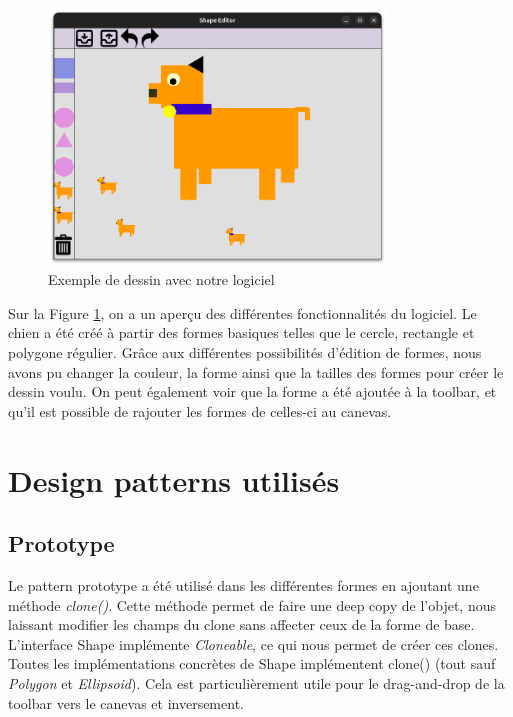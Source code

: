 \documentclass{article}
\begin{document}
\begin{figure}[h]
    \centering
    \includegraphics[width=0.8\textwidth,keepaspectratio]{dog.png}
    \caption{Exemple de dessin avec notre logiciel}
    \label{Clebs}
\end{figure}
\FloatBarrier
Sur la Figure \ref{Clebs}, on a un aperçu des différentes fonctionnalités du logiciel.
 Le chien a été créé à partir des formes basiques telles que le cercle, rectangle et polygone régulier.
 Grâce aux différentes possibilités d'édition de formes, nous avons pu changer la couleur, la forme ainsi que la tailles des formes pour créer le dessin voulu.
 On peut également voir que la forme a été ajoutée à la toolbar, et qu'il est possible de rajouter les formes de celles-ci au canevas.
 
\section{Design patterns utilisés} \label{sec2}

\subsection{Prototype}
Le pattern prototype a été utilisé dans les différentes formes en ajoutant une méthode \textit{clone()}. Cette méthode permet de faire une deep copy de l'objet,
 nous laissant modifier les champs du clone sans affecter ceux de la forme de base.
 L'interface Shape implémente \textit{Cloneable}, ce qui nous permet de créer ces clones.
 Toutes les implémentations concrètes de Shape implémentent clone() (tout sauf \textit{Polygon} et \textit{Ellipsoid}).
 Cela est particulièrement utile pour le drag-and-drop de la toolbar vers le canevas et inversement.
\end{document}
